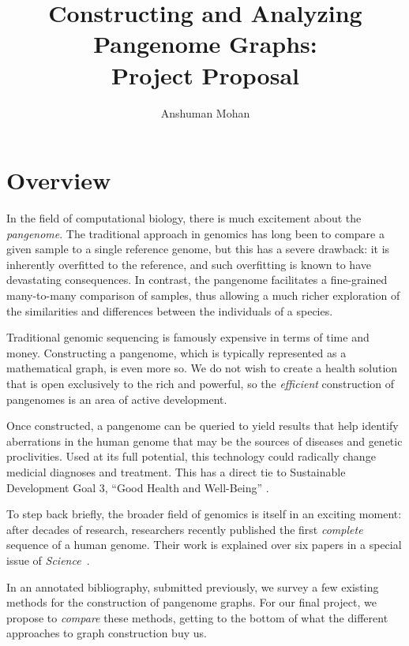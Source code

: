 \documentclass[acmsmall, screen]{acmart}
\begin{document}
\title[Constructing and Analyzing Pangenome Graphs]{Constructing and Analyzing Pangenome Graphs: \\ Project Proposal}
\author{Anshuman Mohan}


\maketitle

\section{Overview}

In the field of computational biology, there is much excitement about the
\emph{pangenome}. The traditional approach in genomics has long been to
compare a given sample to a single reference genome, but this has a
severe drawback: it is inherently overfitted to the reference, and such overfitting is known to have devastating consequences.
In contrast, the pangenome facilitates a fine-grained many-to-many comparison of samples,
thus allowing a much richer exploration of the similarities and differences
between the individuals of a species.

Traditional genomic sequencing is famously expensive in terms of time and money.
Constructing a pangenome, which is typically represented as a mathematical graph, is even more so.
We do not wish to create a health
solution that is open exclusively to the rich and powerful,
so the \emph{efficient} construction of
pangenomes is an area of active development.

Once constructed, a pangenome can be queried to yield results that help
identify aberrations in the human genome that may be the sources of diseases and
genetic proclivities. Used at its full potential, this technology could
radically change medicial diagnoses and treatment. This has a
direct tie to Sustainable Development Goal 3, ``Good Health and Well-Being''
\cite{sdg}.

To step back briefly, the broader field of genomics is itself in an exciting moment: after decades of research, researchers recently published the first \emph{complete} sequence of a human genome.
Their work is explained over six papers in a special issue of \emph{Science}~\cite{science}.

In an annotated bibliography, submitted previously, we survey a few existing methods for the construction of pangenome graphs.
For our final project, we propose to \emph{compare} these methods, getting to the bottom of what the different approaches to graph construction buy us.
\end{document}
